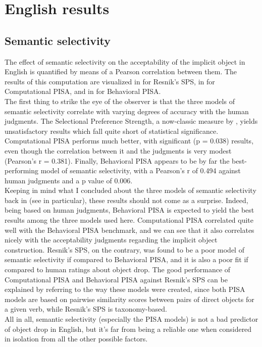 \section{English results} 

\subsection{Semantic selectivity} 

The effect of semantic selectivity on the acceptability of the implicit object in English is quantified by means of a Pearson correlation between them. The results of this computation are visualized in  for Resnik's SPS, in  for Computational PISA, and in  for Behavioral PISA.\\
The first thing to strike the eye of the observer is that the three models of semantic selectivity correlate with varying degrees of accuracy with the human judgments. The Selectional Preference Strength, a now-classic measure by \textcite{Resnik1993,Resnik1996}, yields unsatisfactory results which fall quite short of statistical significance. Computational PISA performs much better, with significant (p = 0.038) results, even though the correlation between it and the judgments is very modest (Pearson's r = 0.381). Finally, Behavioral PISA appears to be by far the best-performing model of semantic selectivity, with a Pearson's r of 0.494 against human judgments and a p value of 0.006.\\ 
Keeping in mind what I concluded about the three models of semantic selectivity back in  (see  in particular), these results should not come as a surprise. Indeed, being based on human judgments, Behavioral PISA is expected to yield the best results among the three models used here. Computational PISA correlated quite well with the Behavioral PISA benchmark, and we can see that it also correlates nicely with the acceptability judgments regarding the implicit object construction. Resnik's SPS, on the contrary, was found to be a poor model of semantic selectivity if compared to Behavioral PISA, and it is also a poor fit if compared to human ratings about object drop. The good performance of Computational PISA and Behavioral PISA against Resnik's SPS can be explained by referring to the way these models were created, since both PISA models are based on pairwise similarity scores between pairs of direct objects for a given verb, while Resnik's SPS is taxonomy-based.\\
All in all, semantic selectivity (especially the PISA models) is not a bad predictor of object drop in English, but it's far from being a reliable one when considered in isolation from all the other possible factors.

